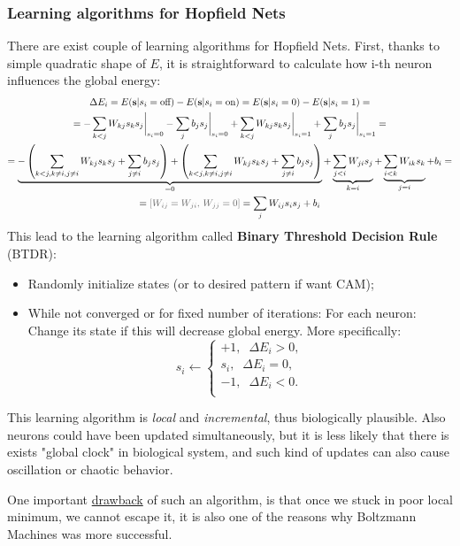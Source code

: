 \vspace{1em}
\subsubsection{Learning algorithms for Hopfield Nets}
There are exist couple of learning algorithms for Hopfield Nets.
First, thanks to simple quadratic shape of $E$, it is straightforward to calculate how i-th neuron influences the global energy:
\begin{gather*}
\Delta E_i = E(\mathbf{s}|s_i=\text{off}) - E(\mathbf{s}|s_i=\text{on}) = E(\mathbf{s}|s_i=0) - E(\mathbf{s}|s_i=1) =\\= -\sum_{k<j}W_{kj}s_ks_j\evalat{s_i=0} -\sum_{j}b_js_j\evalat{s_i=0}  + \sum_{k<j}W_{kj}s_ks_j\evalat{s_i=1} + \sum_{j}b_js_j\evalat{s_i=1} =\\=
\underbrace{-\l( \sum_{k<j, k \neq i, j \neq i}W_{kj}s_ks_j + \sum_{j \neq i}b_js_j \r) + \l( \sum_{k<j, k \neq i, j \neq i}W_{kj}s_ks_j + \sum_{j \neq i}b_js_j \r)}_{=0} +
\underbrace{\sum_{j<i}W_{ji}s_j}_{k=i} + \underbrace{\sum_{i<k}W_{ik}s_k}_{j=i} + b_i =\\= \comment{$W_{ij}=W_{ji}$, $W_{jj}=0$} = \sum_jW_{ij}s_is_j + b_i
\end{gather*}
This lead to the learning algorithm called \textbf{Binary Threshold Decision Rule} (BTDR):
\begin{itemize}
\item Randomly initialize states (or to desired pattern if want CAM);
\item While not converged or for fixed number of iterations:
	\subitem For each neuron:
		\subsubitem Change its state if this will decrease global energy. More specifically:
		 $$
		 s_i \leftarrow
		 \begin{cases}
		 +1,  \;\;\Delta E_i > 0,\\
		 s_i, \;\;\Delta E_i = 0,\\
		 -1,  \;\;\Delta E_i < 0.\\
		 \end{cases}
		 $$
\end{itemize}
This learning algorithm is \emph{local} and \emph{incremental}, thus biologically plausible. Also neurons could have been updated simultaneously, but it is less likely that there is exists "global clock" in biological system, and such kind of updates can also cause oscillation or chaotic behavior.

One important \underline{drawback} of such an algorithm, is that once we stuck in poor local minimum, we cannot escape it, it is also one of the reasons why Boltzmann Machines was more successful.

